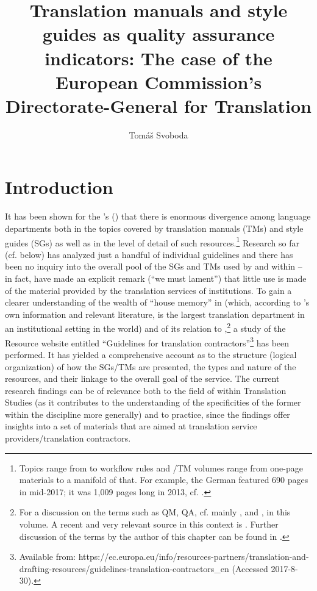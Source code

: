 \documentclass[output=paper]{langsci/langscibook}
\author{Tomáš Svoboda\affiliation{Charles University, Prague}}
\title{Translation manuals and style guides as quality assurance indicators: \newlineCover The case of the European Commission’s Directorate-General for Translation}
\begin{document}
\section{Introduction}\label{sec:svoboda:1} 

It has been shown for the ’s  () that there is enormous divergence among language departments both in the topics covered by translation manuals (TMs) and style guides (SGs) as well as in the level of detail of such resources.\footnote{Topics range from  to workflow rules and /TM volumes range from one-page materials to a manifold of that. For example, the German  featured 690 pages in mid-2017; it was 1,009 pages long in 2013, cf. \citet{Svoboda2013}.} Research so far (cf.  below) has analyzed just a handful of individual guidelines and there has been no inquiry into the overall pool of the SGs and TMs used by and within  – in fact, \citet[56]{FelipeBoto2009} have made an explicit remark (“we must lament”) that little use is made of the material provided by the translation services of  institutions. To gain a clearer understanding of the wealth of “house memory” in  (which, according to ’s own information and relevant literature, is the largest translation department in an institutional setting in the world) and of its relation to ,\footnote{For a discussion on the terms such as QM, QA, cf. mainly \citeauthor{Biel2017tv,Strandvik2017tv}, and \citeauthor{Vandepitte2017tv}, in this volume. A recent and very relevant source in this context is \citet{PrietoRamos2017}. Further discussion of the terms by the author of this chapter can be found in \citet{Svoboda2017forthcoming}.}
a study of the  Resource website entitled “Guidelines for translation contractors”\footnote{Available from: https://ec.europa.eu/info/resources-partners/translation-and-drafting-resources/guidelines-translation-contractors\_en (Accessed 2017-8-30).} has been performed. It has yielded a comprehensive account as to the structure (logical organization) of how the SGs/TMs are presented, the types and nature of the resources, and their linkage to the overall  goal of the service. The current research findings can be of relevance both to the field of  within Translation Studies (as it contributes to the understanding of the specificities of the former within the discipline more generally) and to practice, since the findings offer insights into a set of materials that are aimed at translation service providers/translation contractors.
\end{document}
